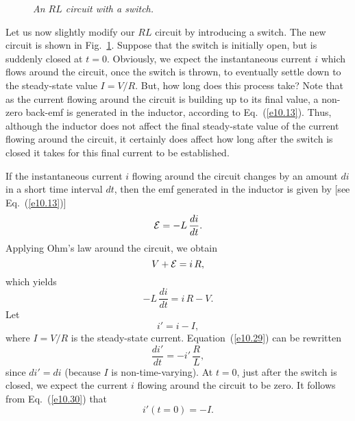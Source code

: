 \begin{figure}[h]
\epsfysize=2in
\centerline{}
\caption{\em An $RL$ circuit with a switch.}\label{f10.3}
\end{figure}

Let us  now slightly modify our $RL$ circuit by introducing a switch.
The new circuit is shown in Fig.~\ref{f10.3}. Suppose that the switch is initially open, but is 
suddenly closed
at $t=0$. Obviously, we expect the instantaneous current $i$  which flows
around  the circuit, once the switch is thrown, to eventually settle
down to the steady-state 
value $I=V/R$. But, how long does this process take? Note that as the current flowing around
the circuit is building up to its final value, a non-zero back-emf is generated in the
inductor, according to Eq.~(\ref{e10.13}). Thus, although the inductor does not
affect the final steady-state value of the current flowing around the circuit,
it certainly does affect how long after the switch is closed it takes
for this final current to be established. 

If the instantaneous current $i$ flowing around the circuit changes by an
amount $di$ in a short time interval $d t$, then the
emf generated in the inductor is given by [see Eq.~(\ref{e10.13})]
\begin{equation}
{\cal E} = - L\,\frac{d i}{d t}.
\end{equation}
Applying Ohm's law around the circuit, we obtain
\begin{equation}
V + {\cal E} = i\,R,
\end{equation}
which yields
\begin{equation}\label{e10.29}
-L\,\frac{d i}{d t} = i\,R - V.
\end{equation}
Let
\begin{equation}
i' = i - I,\label{e10.30}
\end{equation}
where $I=V/R$ is the steady-state current. Equation~(\ref{e10.29}) can be rewritten
\begin{equation}\label{e10.31}
\frac{d i'}{d t} = -i'\,\frac{R}{L},
\end{equation}
since $di'=di$ (because $I$ is non-time-varying). 
At $t=0$, just after the switch is closed, we expect the current $i$ flowing
around the circuit to be zero. It follows from Eq.~(\ref{e10.30}) that
\begin{equation}\label{e10.32}
i'(t=0)=-I.
\end{equation}

